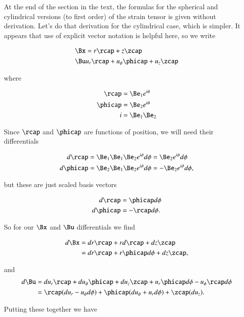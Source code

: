 At the end of the section in the text, the formulas for the spherical and cylindrical versions (to first order) of the strain tensor is given without derivation.  Let's do that derivation for the cylindrical case, which is simpler.  It appears that use of explicit vector notation is helpful here, so we write

\begin{align}\label{eqn:continuumL2:370}
\Bx &= r \rcap + z \zcap \\
\Bu & u_r \rcap + u_\phi \phicap + u_z \zcap
\end{align}

where

\begin{align}\label{eqn:continuumL2:390}
\rcap &= \Be_1 e^{i\phi} \\
\phicap &= \Be_2 e^{i\phi} \\
i &= \Be_1 \Be_2
\end{align}

Since $\rcap$ and $\phicap$ are functions of position, we will need their differentials

\begin{align}\label{eqn:continuumL2:410}
d\rcap &= \Be_1 \Be_1 \Be_2 e^{i\phi} d\phi = \Be_2 e^{i \phi} d\phi \\
d\phicap &= \Be_2 \Be_1 \Be_2 e^{i\phi} d\phi = -\Be_2 e^{i \phi} d\phi,
\end{align}

but these are just scaled basis vectors

\begin{align}\label{eqn:continuumL2:430}
d\rcap &= \phicap d\phi \\
d\phicap &= -\rcap d\phi.
\end{align}

So for our $\Bx$ and $\Bu$ differentials we find

\begin{align*}
d\Bx 
&= dr \rcap + r d\rcap + dz \zcap \\
&= dr \rcap + r \phicap d\phi + dz \zcap,
\end{align*}

and
\begin{align*}
d\Bu 
&= du_r \rcap + du_\phi \phicap + du_z \zcap 
+ u_r \phicap d\phi - u_\phi \rcap d\phi \\
&= \rcap( du_r - u_\phi d\phi )
+ \phicap ( du_\phi + u_r d\phi )
+ \zcap ( du_z ).
\end{align*}

Putting these together we have

